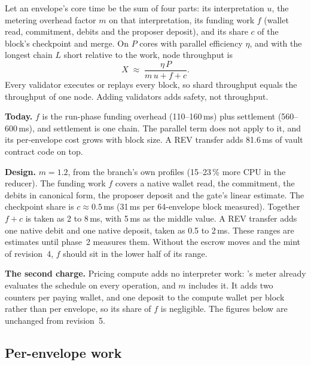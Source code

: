 \documentclass[11pt]{article}
\newcommand{\code}{\path}
\begin{document}
Let an envelope's core time be the sum of four parts: its interpretation $u$, the metering overhead factor $m$ on that interpretation, its funding work $f$ (wallet read, commitment, debits and the proposer deposit), and its share $c$ of the block's checkpoint and merge. On $P$ cores with parallel efficiency $\eta$, and with the longest chain $L$ short relative to the work, node throughput is
\[
X \;\approx\; \frac{\eta\,P}{m\,u + f + c}.
\]
Every validator executes or replays every block, so shard throughput equals the throughput of one node. Adding validators adds safety, not throughput.

\textbf{Today.} $f$ is the run-phase funding overhead (110--160\,ms) plus settlement (560--600\,ms), and settlement is one chain. The parallel term does not apply to it, and its per-envelope cost grows with block size. A REV transfer adds 81.6\,ms of vault contract code on top.

\textbf{Design.} $m = 1.2$, from the branch's own profiles (15--23\,\% more CPU in the reducer). The funding work $f$ covers a native wallet read, the commitment, the debits in canonical form, the proposer deposit and the gate's linear estimate. The checkpoint share is $c \approx 0.5$\,ms (31\,ms per 64-envelope block measured). Together $f + c$ is taken as 2 to 8\,ms, with 5\,ms as the middle value. A REV transfer adds one native debit and one native deposit, taken as 0.5 to 2\,ms. These ranges are estimates until phase~2 measures them. Without the escrow moves and the mint of revision~4, $f$ should sit in the lower half of its range.

\textbf{The second charge.} Pricing compute adds no interpreter work: \code{dev}'s meter already evaluates the schedule on every operation, and $m$ includes it. It adds two counters per paying wallet, and one deposit to the compute wallet per block rather than per envelope, so its share of $f$ is negligible. The figures below are unchanged from revision~5.

\subsection{Per-envelope work}
\end{document}
